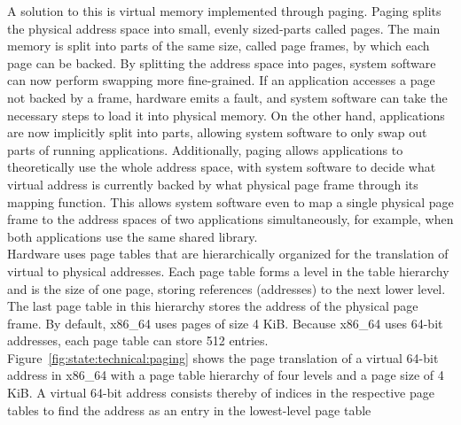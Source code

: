 A solution to this is virtual memory implemented through
paging.\cite{tanenbaum2015modern} Paging splits the physical address space into
small, evenly sized-parts called pages. The main memory is split into parts of
the same size, called page frames, by which each page can be backed. By
splitting the address space into pages, system software can now perform swapping
more fine-grained. If an application accesses a page not backed by a frame,
hardware emits a fault, and system software can take the necessary steps to load
it into physical memory. On the other hand, applications are now implicitly
split into parts, allowing system software to only swap out parts of running
applications. Additionally, paging allows applications to theoretically use the
whole address space, with system software to decide what virtual address is
currently backed by what physical page frame through its mapping function. This
allows system software even to map a single physical page frame to the address
spaces of two applications simultaneously, for example, when both applications
use the same shared library.\\

Hardware uses page tables that are hierarchically organized for the translation
of virtual to physical addresses. Each page table forms a level in the table
hierarchy and is the size of one page, storing references (addresses) to the
next lower level. The last page table in this hierarchy stores the address of
the physical page frame. By default, x86\_64 uses pages of size 4 KiB. Because
x86\_64 uses 64-bit addresses, each page table can store 512 entries.
Figure~\ref{fig:state:technical:paging} shows the page translation of a virtual
64-bit address in x86\_64 with a page table hierarchy of four levels and a page
size of 4 KiB. A virtual 64-bit address consists thereby of indices in the
respective page tables to find the address as an entry in the lowest-level page
table\\

